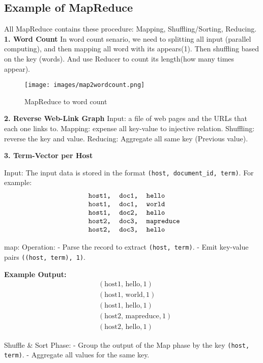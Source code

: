 \documentclass[12pt]{article}
\begin{document}
\subsection{Example of MapReduce}
All MapReduce contains these procedure: Mapping, Shuffling/Sorting, Reducing.
\textbf{1. Word Count}
In word count senario, we need to splitting all input (parallel computing), and then mapping all word with its appears(1). Then shuffling based on the key (words). And use Reducer to count its length(how many times appear).


\begin{figure}[htbp]
    \centering
    \texttt{[image: images/map2wordcount.png]}
    \caption{MapReduce to word count}
    \label{fig:gfs}
\end{figure}

\textbf{2. Reverse Web-Link Graph}
Input: a file of web pages and the URLs that each one links to.
Mapping: expense all key-value to injective relation.
Shuffling: reverse the key and value.
Reducing: Aggregate all same key (Previous value).

\textbf{3. Term-Vector per Host}


Input: The input data is stored in the format \texttt{(host, document\_id, term)}. For example:
\[
\texttt{
\begin{tabular}{lll}
host1, & doc1, & hello \\
host1, & doc1, & world \\
host1, & doc2, & hello \\
host2, & doc3, & mapreduce \\
host2, & doc3, & hello \\
\end{tabular}}
\]


map: Operation:
- Parse the record to extract \texttt{(host, term)}.
- Emit key-value pairs \texttt{((host, term), 1)}.

\textbf{Example Output:}
\[
\begin{aligned}
&(\text{host1, hello}, 1) \\
&(\text{host1, world}, 1) \\
&(\text{host1, hello}, 1) \\
&(\text{host2, mapreduce}, 1) \\
&(\text{host2, hello}, 1)
\end{aligned}
\]

Shuffle \& Sort Phase:
- Group the output of the Map phase by the key \texttt{(host, term)}.
- Aggregate all values for the same key.
\end{document}
